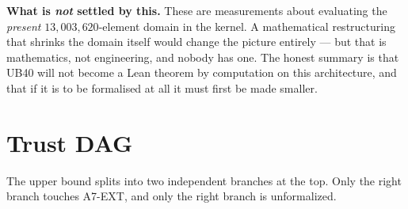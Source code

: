 \documentclass[11pt,a4paper]{article}
\theoremstyle{plain}
\theoremstyle{definition}
\theoremstyle{remark}
\begin{document}
\noindent
\textbf{What is \emph{not} settled by this.} These are measurements about
evaluating the \emph{present} $13{,}003{,}620$-element domain in the kernel. A
mathematical restructuring that shrinks the domain itself would change the
picture entirely --- but that is mathematics, not engineering, and nobody has
one. The honest summary is that \textsf{UB40} will not become a Lean theorem by
computation on this architecture, and that if it is to be formalised at all it
must first be made smaller.

\begin{center}
\end{center}

\section{Trust DAG}

The upper bound splits into two independent branches at the top. Only the right
branch touches \textsf{A7-EXT}, and only the right branch is unformalized.
\end{document}
